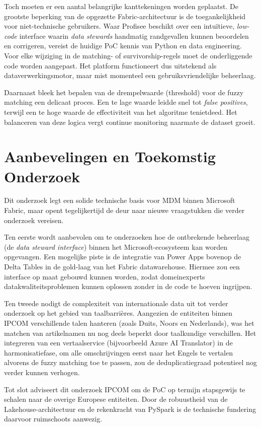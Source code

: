 Toch moeten er een aantal belangrijke kanttekeningen worden geplaatst. De grootste beperking van de opgezette Fabric-architectuur is de toegankelijkheid voor niet-technische gebruikers. Waar Profisee beschikt over een intuïtieve, \textit{low-code} interface waarin \textit{data stewards} handmatig randgevallen kunnen beoordelen en corrigeren, vereist de huidige PoC kennis van Python en data engineering. Voor elke wijziging in de matching- of survivorship-regels moet de onderliggende code worden aangepast. Het platform functioneert dus uitstekend als dataverwerkingsmotor, maar mist momenteel een gebruiksvriendelijke beheerlaag.

Daarnaast bleek het bepalen van de drempelwaarde (threshold) voor de fuzzy matching een delicaat proces. Een te lage waarde leidde snel tot \textit{false positives}, terwijl een te hoge waarde de effectiviteit van het algoritme tenietdeed. Het balanceren van deze logica vergt continue monitoring naarmate de dataset groeit.

\section*{Aanbevelingen en Toekomstig Onderzoek}

Dit onderzoek legt een solide technische basis voor MDM binnen Microsoft Fabric, maar opent tegelijkertijd de deur naar nieuwe vraagstukken die verder onderzoek vereisen. 

Ten eerste wordt aanbevolen om te onderzoeken hoe de ontbrekende beheerlaag (de \textit{data steward interface}) binnen het Microsoft-ecosysteem kan worden opgevangen. Een mogelijke piste is de integratie van Power Apps bovenop de Delta Tables in de gold-laag van het Fabric datawarehouse. Hiermee zou een interface op maat gebouwd kunnen worden, zodat domeinexperts datakwaliteitsproblemen kunnen oplossen zonder in de code te hoeven ingrijpen.

Ten tweede nodigt de complexiteit van internationale data uit tot verder onderzoek op het gebied van taalbarrières. Aangezien de entiteiten binnen IPCOM verschillende talen hanteren (zoals Duits, Noors en Nederlands), was het matchen van artikelnamen nu nog deels beperkt door taalkundige verschillen. Het integreren van een vertaalservice (bijvoorbeeld Azure AI Translator) in de harmonisatiefase, om alle omschrijvingen eerst naar het Engels te vertalen alvorens de fuzzy matching toe te passen, zou de deduplicatiegraad potentieel nog verder kunnen verhogen.

Tot slot adviseert dit onderzoek IPCOM om de PoC op termijn stapsgewijs te schalen naar de overige Europese entiteiten. Door de robuustheid van de Lakehouse-architectuur en de rekenkracht van PySpark is de technische fundering daarvoor ruimschoots aanwezig.